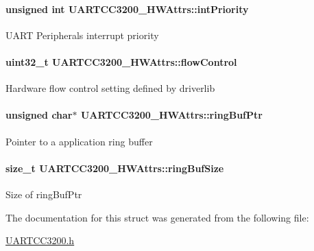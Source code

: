 \paragraph[{int\+Priority}]{\setlength{\rightskip}{0pt plus 5cm}unsigned int U\+A\+R\+T\+C\+C3200\+\_\+\+H\+W\+Attrs\+::int\+Priority}\label{struct_u_a_r_t_c_c3200___h_w_attrs_a4949d5f8d8f2e244ef949c6a3c0829c9}
U\+A\+R\+T Peripheral\textquotesingle{}s interrupt priority 
\paragraph[{flow\+Control}]{\setlength{\rightskip}{0pt plus 5cm}uint32\+\_\+t U\+A\+R\+T\+C\+C3200\+\_\+\+H\+W\+Attrs\+::flow\+Control}\label{struct_u_a_r_t_c_c3200___h_w_attrs_abfe1406d34c1592bab7fb32f741943b3}
Hardware flow control setting defined by driverlib 
\paragraph[{ring\+Buf\+Ptr}]{\setlength{\rightskip}{0pt plus 5cm}unsigned char$\ast$ U\+A\+R\+T\+C\+C3200\+\_\+\+H\+W\+Attrs\+::ring\+Buf\+Ptr}\label{struct_u_a_r_t_c_c3200___h_w_attrs_aa6c7f90459e3145fdc3a2d94392911d6}
Pointer to a application ring buffer 
\paragraph[{ring\+Buf\+Size}]{\setlength{\rightskip}{0pt plus 5cm}size\+\_\+t U\+A\+R\+T\+C\+C3200\+\_\+\+H\+W\+Attrs\+::ring\+Buf\+Size}\label{struct_u_a_r_t_c_c3200___h_w_attrs_a85b3df2ec52bcd2cef4a55efe823f978}
Size of ring\+Buf\+Ptr 

The documentation for this struct was generated from the following file\+:\begin{DoxyCompactItemize}
\item 
\hyperlink{_u_a_r_t_c_c3200_8h}{U\+A\+R\+T\+C\+C3200.\+h}\end{DoxyCompactItemize}
